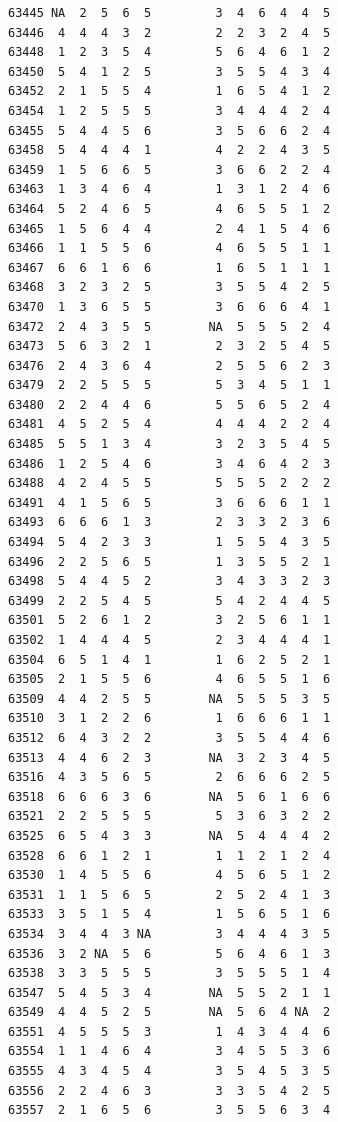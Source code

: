 \documentclass[
  letterpaper,
  DIV=11,
  numbers=noendperiod]{scrreprt}
\begin{document}
\begin{verbatim}
63445 NA  2  5  6  5         3  4  6  4  4  5
63446  4  4  4  3  2         2  2  3  2  4  5
63448  1  2  3  5  4         5  6  4  6  1  2
63450  5  4  1  2  5         3  5  5  4  3  4
63452  2  1  5  5  4         1  6  5  4  1  2
63454  1  2  5  5  5         3  4  4  4  2  4
63455  5  4  4  5  6         3  5  6  6  2  4
63458  5  4  4  4  1         4  2  2  4  3  5
63459  1  5  6  6  5         3  6  6  2  2  4
63463  1  3  4  6  4         1  3  1  2  4  6
63464  5  2  4  6  5         4  6  5  5  1  2
63465  1  5  6  4  4         2  4  1  5  4  6
63466  1  1  5  5  6         4  6  5  5  1  1
63467  6  6  1  6  6         1  6  5  1  1  1
63468  3  2  3  2  5         3  5  5  4  2  5
63470  1  3  6  5  5         3  6  6  6  4  1
63472  2  4  3  5  5        NA  5  5  5  2  4
63473  5  6  3  2  1         2  3  2  5  4  5
63476  2  4  3  6  4         2  5  5  6  2  3
63479  2  2  5  5  5         5  3  4  5  1  1
63480  2  2  4  4  6         5  5  6  5  2  4
63481  4  5  2  5  4         4  4  4  2  2  4
63485  5  5  1  3  4         3  2  3  5  4  5
63486  1  2  5  4  6         3  4  6  4  2  3
63488  4  2  4  5  5         5  5  5  2  2  2
63491  4  1  5  6  5         3  6  6  6  1  1
63493  6  6  6  1  3         2  3  3  2  3  6
63494  5  4  2  3  3         1  5  5  4  3  5
63496  2  2  5  6  5         1  3  5  5  2  1
63498  5  4  4  5  2         3  4  3  3  2  3
63499  2  2  5  4  5         5  4  2  4  4  5
63501  5  2  6  1  2         3  2  5  6  1  1
63502  1  4  4  4  5         2  3  4  4  4  1
63504  6  5  1  4  1         1  6  2  5  2  1
63505  2  1  5  5  6         4  6  5  5  1  6
63509  4  4  2  5  5        NA  5  5  5  3  5
63510  3  1  2  2  6         1  6  6  6  1  1
63512  6  4  3  2  2         3  5  5  4  4  6
63513  4  4  6  2  3        NA  3  2  3  4  5
63516  4  3  5  6  5         2  6  6  6  2  5
63518  6  6  6  3  6        NA  5  6  1  6  6
63521  2  2  5  5  5         5  3  6  3  2  2
63525  6  5  4  3  3        NA  5  4  4  4  2
63528  6  6  1  2  1         1  1  2  1  2  4
63530  1  4  5  5  6         4  5  6  5  1  2
63531  1  1  5  6  5         2  5  2  4  1  3
63533  3  5  1  5  4         1  5  6  5  1  6
63534  3  4  4  3 NA         3  4  4  4  3  5
63536  3  2 NA  5  6         5  6  4  6  1  3
63538  3  3  5  5  5         3  5  5  5  1  4
63547  5  4  5  3  4        NA  5  5  2  1  1
63549  4  4  5  2  5        NA  5  6  4 NA  2
63551  4  5  5  5  3         1  4  3  4  4  6
63554  1  1  4  6  4         3  4  5  5  3  6
63555  4  3  4  5  4         3  5  4  5  3  5
63556  2  2  4  6  3         3  3  5  4  2  5
63557  2  1  6  5  6         3  5  5  6  3  4

\end{verbatim}
\end{document}
